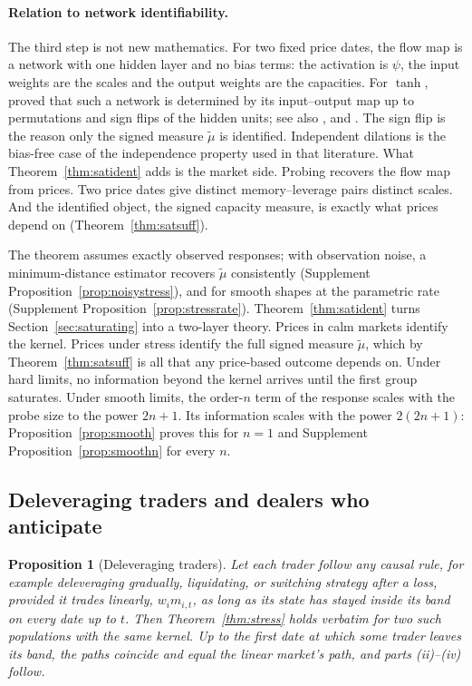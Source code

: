 \documentclass[12pt]{article}
\newtheorem{proposition}[theorem]{Proposition}
\theoremstyle{definition}
\theoremstyle{remark}
\begin{document}
\paragraph{Relation to network identifiability.} The third step is not new mathematics. For two fixed price dates, the flow map is a network with one hidden layer and no bias terms: the activation is $\psi$, the input weights are the scales and the output weights are the capacities. For $\tanh$, \citet{sussmann1992} proved that such a network is determined by its input--output map up to permutations and sign flips of the hidden units; see also \citet{albertini1993}, \citet{fefferman1994} and \citet{vlacic2019}. The sign flip is the reason only the signed measure $\tilde\mu$ is identified. Independent dilations is the bias-free case of the independence property used in that literature. What Theorem~\ref{thm:satident} adds is the market side. Probing recovers the flow map from prices. Two price dates give distinct memory--leverage pairs distinct scales. And the identified object, the signed capacity measure, is exactly what prices depend on (Theorem~\ref{thm:satsuff}).

The theorem assumes exactly observed responses; with observation noise, a minimum-distance estimator recovers $\tilde\mu$ consistently (Supplement Proposition~\ref{prop:noisystress}), and for smooth shapes at the parametric rate (Supplement Proposition~\ref{prop:stressrate}). Theorem~\ref{thm:satident} turns Section~\ref{sec:saturating} into a two-layer theory. Prices in calm markets identify the kernel. Prices under stress identify the full signed measure $\tilde\mu$, which by Theorem~\ref{thm:satsuff} is all that any price-based outcome depends on. Under hard limits, no information beyond the kernel arrives until the first group saturates. Under smooth limits, the order-$n$ term of the response scales with the probe size to the power $2n+1$. Its information scales with the power $2(2n+1)$: Proposition~\ref{prop:smooth} proves this for $n=1$ and Supplement Proposition~\ref{prop:smoothn} for every $n$.

\subsection{Deleveraging traders and dealers who anticipate}

\begin{proposition}[Deleveraging traders]\label{prop:delever}
Let each trader follow any causal rule, for example deleveraging gradually, liquidating, or switching strategy after a loss, provided it trades linearly, $w_im_{i,t}$, as long as its state has stayed inside its band on every date up to $t$. Then Theorem~\ref{thm:stress} holds verbatim for two such populations with the same kernel. Up to the first date at which some trader leaves its band, the paths coincide and equal the linear market's path, and parts (ii)--(iv) follow.
\end{proposition}
\end{document}
